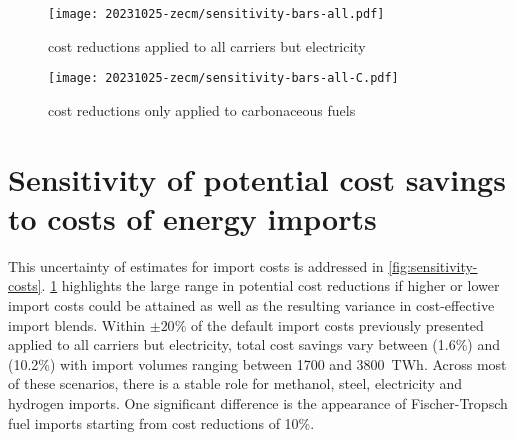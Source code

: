 \begin{figure*}
    \begin{subfigure}[t]{\columnwidth}
        \caption{cost reductions applied to all carriers but electricity}
        \label{fig:sensitivity-costs:A}
        \texttt{[image: 20231025-zecm/sensitivity-bars-all.pdf]}
    \end{subfigure}
    \begin{subfigure}[t]{\columnwidth}
        \caption{cost reductions only applied to carbonaceous fuels}
        \label{fig:sensitivity-costs:B}
        \texttt{[image: 20231025-zecm/sensitivity-bars-all-C.pdf]}
    \end{subfigure}
    \caption{\textbf{Effect of import cost variations on cost savings and import shares.}
    In panel (a), indicated relative cost changes are applied uniformly to all vectors but electricity imports.
    In panel (b), cost changes are only applied to carbonaceous fuels (methane, methanol and Fischer-Tropsch).
    Top subpanels show potential cost savings compared to the scenario with full self-sufficiency.
    Bottom subpanels show the share and composition of different import vectors in relation to total energy system costs.
    }
    \label{fig:sensitivity-costs}
\end{figure*}

\section*{Sensitivity of potential cost savings to costs of energy imports}

This uncertainty of estimates for import costs is addressed in
\cref{fig:sensitivity-costs}. \cref{fig:sensitivity-costs:A} highlights the
large range in potential cost reductions if higher or lower import costs could
be attained as well as the resulting variance in cost-effective import blends.
Within $\pm 20\%$ of the default import costs previously presented applied to
all carriers but electricity, total cost savings vary between 
(1.6\%) and  (10.2\%) with import volumes ranging between 1700 and
3800~TWh. Across most of these scenarios, there is a stable role for methanol,
steel, electricity and hydrogen imports. One significant difference is the
appearance of Fischer-Tropsch fuel imports starting from cost reductions of
10\%.

